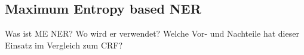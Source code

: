 \subsection{Maximum Entropy based NER}
Was ist ME NER? Wo wird er verwendet? Welche Vor- und Nachteile hat dieser Einsatz im Vergleich zum CRF?

